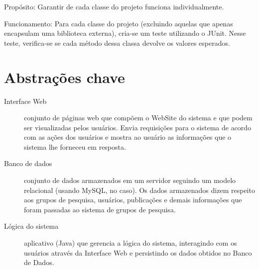 \documentclass[11pt, a4paper]{article}
\begin{document}
            Propósito: Garantir de cada classe do projeto funciona individualmente.

            Funcionamento: Para cada classe do projeto (excluindo aquelas que 
			apenas encapsulam uma biblioteca externa), cria-se um teste utilizando
			o JUnit. Nesse teste, verifica-se se cada método dessa classa devolve
			os valores esperados.
        

    \section{Abstrações chave}
        \begin{description}
            \item[Interface Web] conjunto de páginas web que compõem o WebSite
            do sistema e que podem ser visualizadas pelos usuários. Envia
            requisições para o sistema de acordo com as ações dos usuários e
            mostra ao usuário as informações que o sistema lhe forneceu em
            resposta.

            \item[Banco de dados] conjunto de dados armazenados em um servidor
            seguindo um modelo relacional (usando MySQL, no caso). Os dados
            armazenados dizem respeito aos grupos de pesquisa, usuários,
            publicações e demais informações que foram passadas ao sistema de
            grupos de pesquisa.

            \item[Lógica do sistema] aplicativo (Java) que gerencia a lógica do
            sistema, interagindo com os usuários através da Interface Web e
            persistindo os dados obtidos no Banco de Dados.
        \end{description}
\end{document}
